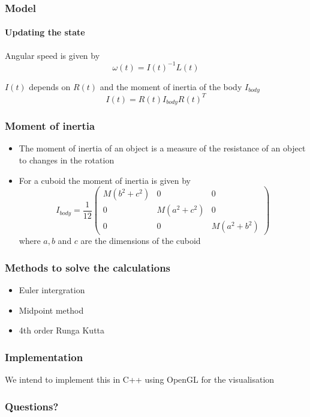 \documentclass{beamer}
\begin{document}
\begin{frame}
 \frametitle{Model}
 \framesubtitle{Updating the state}
 Angular speed is given by
 \begin{displaymath}
  \omega(t) = I(t)^{-1} L(t)
 \end{displaymath}

 $I(t)$ depends on $R(t)$ and the moment of inertia of the body $I_{body}$
 \begin{displaymath}
  I(t) = R(t) I_{body} R(t)^{T}
 \end{displaymath}
\end{frame}

\begin{frame}
 \frametitle{Moment of inertia}
 \begin{itemize}
  \item 
  The moment of inertia of an object is a measure of the resistance of an object to changes in the rotation

  \item
  For a cuboid the moment of inertia is given by
  \begin{displaymath}
    I_{body} = \frac{1}{12} \begin{pmatrix}
			    M(b^2 + c^2) & 0 & 0 \\
			    0 & M(a^2 + c^2) & 0 \\
			    0 & 0 & M(a^2 + b^2)
			    \end{pmatrix}
  \end{displaymath}
  where $a, b$ and $c$ are the dimensions of the cuboid
 \end{itemize}
\end{frame}

\begin{frame}
 \frametitle{Methods to solve the calculations}
 \begin{itemize}
  \item Euler intergration
  \item Midpoint method
  \item 4th order Runga Kutta
 \end{itemize}
\end{frame}

\begin{frame}
 \frametitle{Implementation}
 We intend to implement this in C++ using OpenGL for the visualisation
\end{frame}

 \begin{frame}
  \frametitle{Questions?}
 \end{frame}
\end{document}
